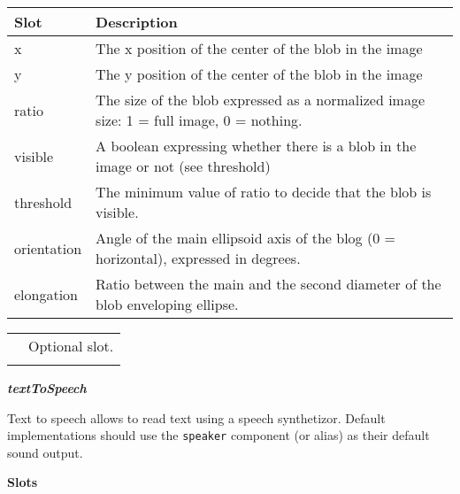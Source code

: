 \documentclass[a4paper]{article}
\begin{document}
\begin{flushleft}
\tablehead{}
\begin{supertabular}{|m{3.293cm}|m{11.997cm}|}
\hline
\sffamily\bfseries Slot &
\sffamily\bfseries Description\\\hline
x &
\sffamily The x position of the center of the
blob in the image\\\hline
y &
\sffamily The y position of the center of the
blob in the image\\\hline
ratio &
\sffamily The size of the blob expressed as a
normalized image size: 1 = full image, 0 = nothing.\\\hline
visible &
\textsf{A boolean expressing whether there is a
blob in the image or not (see }threshold\textsf{)}\\\hline
threshold &
\textsf{The minimum value of }ratio\textsf{ to
decide that the blob is }visible\textsf{.}\\\hline
orientation &
\sffamily Angle of the main ellipsoid axis of
the blog (0 = horizontal), expressed in degrees.\\\hline
elongation &
\sffamily Ratio between the main and the second
diameter of the blob enveloping ellipse.\\\hline
\end{supertabular}
\end{flushleft}
\begin{flushleft}
\tablehead{}
\begin{supertabular}{|m{1.717cm}|m{10.464cm}}
\hhline{-~}
 &
\sffamily Optional slot.\\\hhline{-~}
\end{supertabular}
\end{flushleft}
{\sffamily\bfseries\itshape
textToSpeech}

{\sffamily
Text to speech allows to read text using a speech synthetizor. Default
implementations should use the \texttt{speaker} component (or alias) as
their default sound output.}

{\sffamily\bfseries
Slots}
\end{document}
